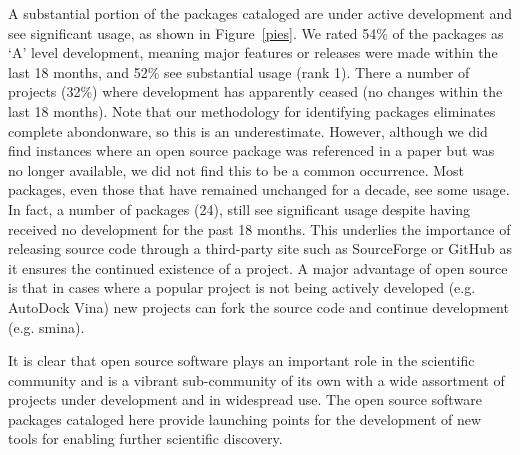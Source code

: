 A substantial portion of the packages cataloged are under active development and see significant usage, as shown in Figure~\ref{pies}.  We rated 54\% of the packages as `A' level development, meaning major features or releases were made within the last 18 months, and 52\% see substantial usage (rank 1).  
There a number of projects (32\%) where development has apparently ceased (no changes within the last 18 months). Note that our methodology for identifying packages eliminates complete abondonware, so this is an underestimate.  However, although we did find instances where an open source package was referenced in a paper but was no longer available, we did not find this to be a common occurrence.  Most packages, even those that have remained unchanged for a decade, see some usage.  In fact, a number of packages (24), still see significant usage despite having received no development for the past 18 months.  This underlies the importance of releasing source code through a third-party site such as SourceForge or GitHub as it ensures the continued existence of a project.  A major advantage of open source is that in cases where a popular project is not being actively developed (e.g. AutoDock Vina) new projects can fork the source code and continue development (e.g. smina).

It is clear that open source software plays an important role in the scientific community and is a vibrant sub-community of its own with a wide assortment of projects under development and in widespread use.  The open source software packages cataloged here provide launching points for the development of new tools for enabling further scientific discovery.
